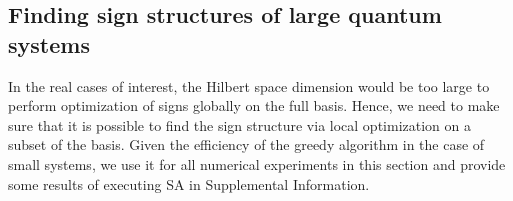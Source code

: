 


\subsection{Finding sign structures of large quantum systems}

In the real cases of interest, the Hilbert space dimension would be too large to perform optimization of signs globally on the full basis. Hence, we need to make sure that it is possible to find the sign structure via local optimization on a subset of the basis. Given the efficiency of the greedy algorithm in the case of small systems, we use it for all numerical experiments in this section and provide some results of executing SA in Supplemental Information.

